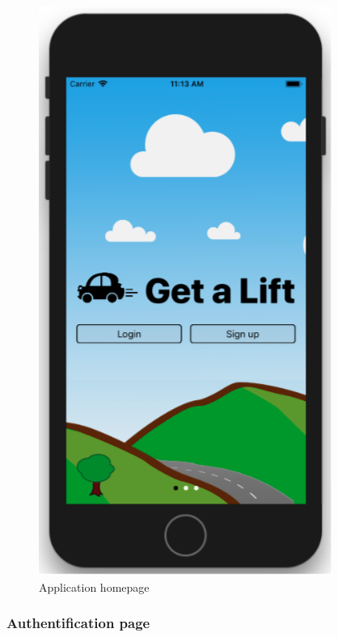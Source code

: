 \begin{figure}[h!]
\begin{center}
\includegraphics[scale = 0.3]{diagrams/ApplicationHomepage.png} 
\end{center}
\caption{Application homepage}
\end{figure}

\subsubsection{Authentification page}

